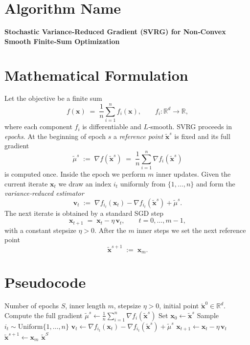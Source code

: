 \documentclass{article}
\begin{document}
\section*{Algorithm Name}
\textbf{Stochastic Variance‑Reduced Gradient (SVRG) for Non‑Convex Smooth Finite‑Sum Optimization}

\section*{Mathematical Formulation}
Let the objective be a finite sum
\[
f(\mathbf{x})\;=\;\frac{1}{n}\sum_{i=1}^{n} f_i(\mathbf{x}),\qquad 
f_i:\mathbb{R}^{d}\to\mathbb{R},
\]
where each component $f_i$ is differentiable and $L$‑smooth.  
SVRG proceeds in \emph{epochs}.  At the beginning of epoch $s$ a \emph{reference point}
\(\tilde{\mathbf{x}}^{s}\) is fixed and its full gradient
\[
\tilde{\mu}^{s}\;:=\;\nabla f(\tilde{\mathbf{x}}^{s})
          \;=\;\frac{1}{n}\sum_{i=1}^{n}\nabla f_i(\tilde{\mathbf{x}}^{s})
\tag{1}
\]
is computed once.  Inside the epoch we perform $m$ inner updates.  
Given the current iterate $\mathbf{x}_t$ we draw an index $i_t$ uniformly from $\{1,\dots ,n\}$ and form the \emph{variance‑reduced estimator}
\[
\mathbf{v}_t\;:=\;\nabla f_{i_t}(\mathbf{x}_t)-\nabla f_{i_t}(\tilde{\mathbf{x}}^{s})
                 +\tilde{\mu}^{s}.
\tag{2}
\]
The next iterate is obtained by a standard SGD step
\[
\mathbf{x}_{t+1}\;=\;\mathbf{x}_t-\eta\,\mathbf{v}_t,
\qquad t=0,\dots ,m-1,
\tag{3}
\]
with a constant stepsize $\eta>0$.  After the $m$ inner steps we set the next reference point
\[
\tilde{\mathbf{x}}^{s+1}\;:=\;\mathbf{x}_{m}.
\tag{4}
\]

\section*{Pseudocode}
\begin{algorithm}[H]
\caption{SVRG for non‑convex $L$‑smooth finite‑sum}
\begin{algorithmic}[1]
\Require Number of epochs $S$, inner length $m$, stepsize $\eta>0$,
         initial point $\tilde{\mathbf{x}}^{0}\in\mathbb{R}^{d}$.
    \State Compute the full gradient \(\tilde{\mu}^{s}\gets \frac{1}{n}\sum_{i=1}^{n}\nabla f_i(\tilde{\mathbf{x}}^{s})\) 
    \State Set $\mathbf{x}_0 \gets \tilde{\mathbf{x}}^{s}$
        \State Sample $i_t\sim\mathrm{Uniform}\{1,\dots ,n\}$
        \State $\mathbf{v}_t\gets \nabla f_{i_t}(\mathbf{x}_t)-\nabla f_{i_t}(\tilde{\mathbf{x}}^{s})+\tilde{\mu}^{s}$
        \State $\mathbf{x}_{t+1}\gets \mathbf{x}_t-\eta\,\mathbf{v}_t$
    \EndFor
    \State $\tilde{\mathbf{x}}^{s+1}\gets \mathbf{x}_m$
\EndFor
\State \Return $\tilde{\mathbf{x}}^{S}$
\end{algorithmic}
\end{algorithm}
\end{document}
